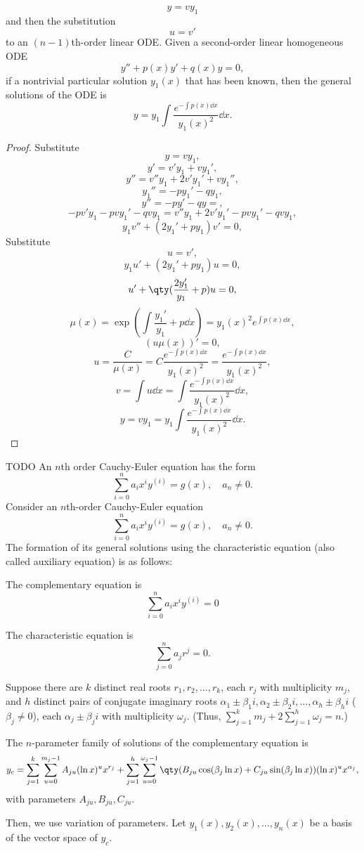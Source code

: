 \documentclass[a4paper,12pt]{report}
\begin{document}
\[y=vy_1\]
and then the substitution
\[u=v'\]
to an $(n-1)$th-order linear ODE.
Given a second-order linear homogeneous ODE
\[y''+p(x)y'+q(x)y=0,\]
if a nontrivial particular solution $y_1(x)$ that has been known, then the general solutions of the ODE is
\[y=y_1\int\frac{e^{-\int p(x)\dd{x}}}{y_1(x)^2}\dd{x}.\]
\begin{proof}
Substitute
\[y=vy_1,\]
\[y'=v'y_1+vy_1',\]
\[y''=v''y_1+2v'y_1'+vy_1'',\]
\[y_1''=-py_1'-qy_1,\]
\[y''=-py'-qy=,\]
\[-pv'y_1-pvy_1'-qvy_1=v''y_1+2v'y_1'-pvy_1'-qvy_1,\]
\[y_1v''+(2y_1'+py_1)v'=0,\]
Substitute
\[u=v',\]
\[y_1u'+(2y_1'+py_1)u=0,\]
\[u'+\qty(\frac{2y_1'}{y_1}+p)u=0,\]
\[\mu(x)=\exp(\int\frac{y_1'}{y_1}+p\dd{x})=y_1(x)^2e^{\int p(x)\dd{x}},\]
\[(u\mu(x))'=0,\]
\[u=\frac{C}{\mu(x)}=C\frac{e^{-\int p(x)\dd{x}}}{y_1(x)^2}=\frac{e^{-\int p(x)\dd{x}}}{y_1(x)^2},\]
\[v=\int u\dd{x}=\int\frac{e^{-\int p(x)\dd{x}}}{y_1(x)^2}\dd{x},\]
\[y=vy_1=y_1\int\frac{e^{-\int p(x)\dd{x}}}{y_1(x)^2}\dd{x}.\]
\end{proof}
TODO
An $n$th order Cauchy-Euler equation has the form
\[\sum_{i=0}^na_ix^iy^{(i)}=g(x),\quad a_n\ne 0.\]
Consider an $n$th-order Cauchy-Euler equation
\[\sum_{i=0}^na_ix^iy^{(i)}=g(x),\quad a_n\ne 0.\]
The formation of its general solutions using the characteristic equation (also called auxiliary equation) is as follows:
\ben
\item The complementary equation is
\[\sum_{i=0}^na_ix^iy^{(i)}=0\]
\item The characteristic equation is
\[\sum_{j=0}^na_jr^j=0.\]
\item Suppose there are $k$ distinct real roots $r_1,r_2,\ldots,r_k$, each $r_j$ with multiplicity $m_j$, and $h$ distinct pairs of conjugate imaginary roots $\alpha_1\pm\beta_1i,\alpha_2\pm\beta_2i,\ldots,\alpha_h\pm\beta_hi$ ($\beta_j\neq 0$), each $\alpha_j\pm\beta_ji$ with multiplicity $\omega_j$. (Thus, $\sum_{j=1}^km_j+2\sum_{j=1}^h\omega_j=n$.)
\item The $n$-parameter family of solutions of the complementary equation is
\[y_c=\sum_{j=1}^k\sum_{u=0}^{m_j-1}A_{ju}(\ln x)^ux^{r_j}+\sum_{j=1}^h\sum_{u=0}^{\omega_j-1}\qty(B_{ju}\cos(\beta_j\ln x)+C_{ju}\sin(\beta_j\ln x))(\ln x)^ux^{\alpha_j},\]
with parameters $A_{ju},B_{ju},C_{ju}$.
\item Then, we use variation of parameters. Let $y_1(x),y_2(x),\ldots,y_n(x)$ be a basis of the vector space of $y_c$.
\end{document}

